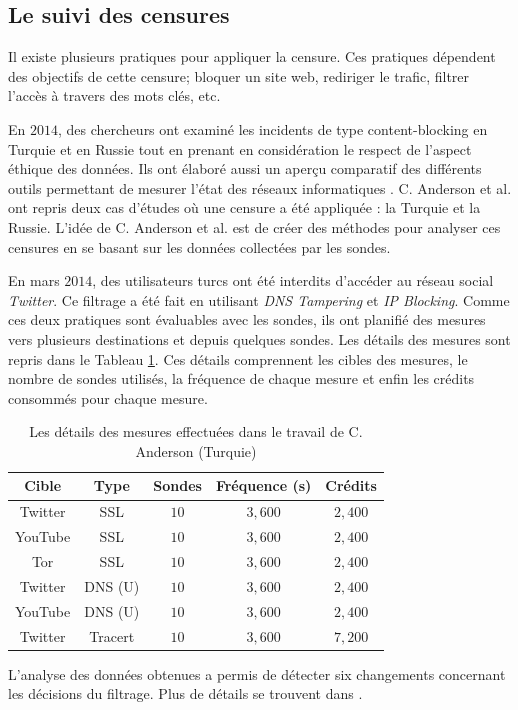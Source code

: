 \subsection{Le suivi des censures}

Il existe plusieurs pratiques pour appliquer la censure. Ces pratiques dépendent des objectifs de cette censure; bloquer un site web, rediriger le trafic, filtrer l'accès à travers des mots clés, etc.

En $2014$, des chercheurs ont examiné les incidents de type content-blocking en Turquie et en  Russie tout en prenant en considération le respect de l'aspect éthique des données. Ils ont  élaboré aussi un aperçu comparatif des différents outils permettant de mesurer l'état des réseaux informatiques \cite{Collin-Anderson}. C. Anderson et al. ont repris deux cas d'études où une censure a été appliquée : la Turquie et la Russie. L'idée de C. Anderson et al. est de créer des méthodes pour analyser ces censures en se basant sur les données collectées par les sondes. \par



En mars $2014$, des utilisateurs turcs ont été interdits d'accéder au réseau social  \textit{Twitter}.  Ce filtrage a été fait en utilisant \textit{DNS Tampering} et \textit{IP Blocking}. Comme ces deux pratiques sont évaluables avec les sondes, ils ont planifié des mesures vers plusieurs destinations et depuis quelques  sondes. Les détails des mesures sont  repris  dans le Tableau  \ref{ta:censorship-colin}. Ces détails comprennent les cibles des mesures, le nombre de sondes utilisés, la fréquence de chaque mesure et enfin les crédits consommés pour chaque mesure.
\begin{table}[H]
	\centering
	\captionsetup{justification=centering}
	\begin{tabular}{ c c c c c}
		\textbf{Cible} &\textbf{Type} &	\textbf{Sondes} &\textbf{Fréquence (s)}	& \textbf{Crédits} \\ \hline
		Twitter &SSL &$ 10 $ &$ 3,600 $ &$ 2,400 $\\ \hline
		YouTube &SSL &$ 10 $ &$ 3,600 $ &$ 2,400 $ \\ \hline
		Tor & SSL &$ 10 $ &$ 3,600 $ &$ 2,400 $ \\ \hline
		Twitter & DNS (U) &$ 10 $ &$ 3,600 $ &$ 2,400 $ \\ \hline
		YouTube & DNS (U) &$ 10 $ &$ 3,600 $ &$ 2,400 $ \\ \hline
		Twitter &Tracert &$ 10 $ &$ 3,600 $ & $ 7,200 $ \\ \hline
	\end{tabular}
	\caption{Les détails des mesures effectuées dans le travail de C. Anderson \cite{Collin-Anderson} (Turquie) }
	\label{ta:censorship-colin}
\end{table}
L'analyse des données obtenues a permis de  détecter  six changements concernant les décisions du filtrage. Plus de détails se trouvent dans \cite{Collin-Anderson}.


